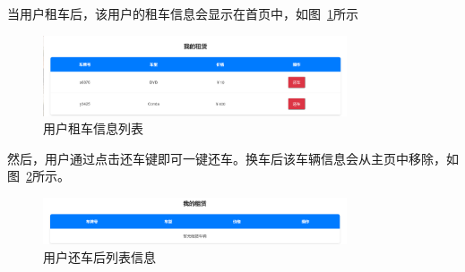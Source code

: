 \documentclass[UTF8,a4paper,12pt]{ctexart}
\begin{document}
当用户租车后，该用户的租车信息会显示在首页中，如图~\ref{fig:rent}所示
\begin{figure}[htbp]  %
    \centering  %
    \includegraphics[width=0.8\textwidth]{pic/rent.png}
    \caption{用户租车信息列表}  %
    \label{fig:rent}  %
\end{figure}
然后，用户通过点击还车键即可一键还车。换车后该车辆信息会从主页中移除，如图~\ref{fig:afrent}所示。
\begin{figure}[htbp]  %
    \centering  %
    \includegraphics[width=0.8\textwidth]{pic/afrent.png}
    \caption{用户还车后列表信息}  %
    \label{fig:afrent}  %
\end{figure}
\end{document}
